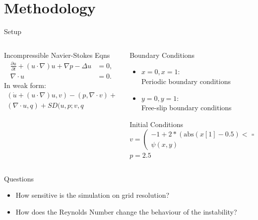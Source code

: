 \documentclass[17pt, t, lualatex]{beamer}
\begin{document}
\section{Methodology}

\begin{frame}{Setup}
\begin{columns}
\begin{column}{0.5\textwidth}
   \begin{block}{Incompressible Navier-Stokes Eqns}
   \begin{align*}
       \frac{\partial u}{\partial t} + (u\cdot \nabla)u + \nabla p -\Delta u &= 0,\\\nabla \cdot u &= 0.
   \end{align*}
    In weak form:
    \begin{align*}
       (\dot u + (u\cdot \nabla)u, v) - (p,\nabla \cdot v) + (\nu \nabla u,\nabla v) &+ \\
       (\nabla \cdot u, q) + SD(u,p;v,q&) = (f,v)
    \end{align*}
    \end{block}
\end{column}
\begin{column}{0.5\textwidth}
    \begin{block}{Boundary Conditions}
    \begin{itemize}
        \item $x = 0, x = 1$:\\
        Periodic boundary conditions
        \item $y = 0, y = 1$:\\
        Free-slip boundary conditions
    \end{itemize}
    \end{block}
    \begin{block}{Initial Conditions}
        $v = \begin{pmatrix}-1 + 2 * (\text{abs}(x[1] - 0.5) <= 0.5)\\
        \psi(x,y)\end{pmatrix}$\\
        $p = 2.5$
    \end{block}
\end{column}
\end{columns}
\end{frame}

\begin{frame}{Questions}
\begin{itemize}
    \item How sensitive is the simulation on grid resolution?
    \item How does the Reynolds Number change the behaviour of the instability?
\end{itemize}
\end{frame}
\end{document}

